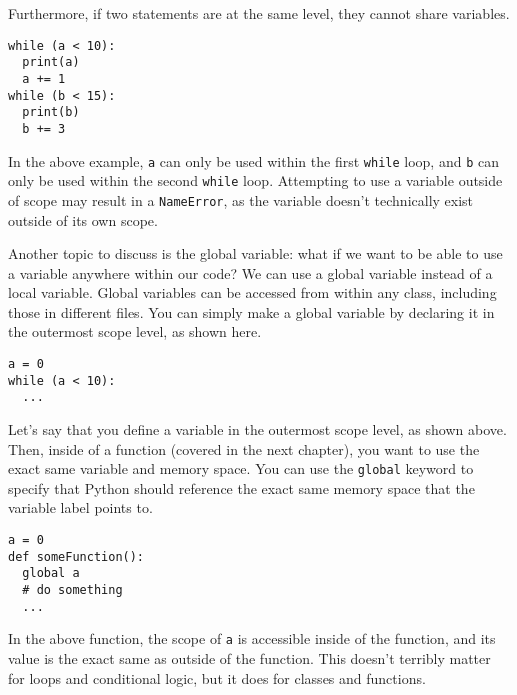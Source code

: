 Furthermore, if two statements are at the same level, they cannot share variables.\par
\begin{lstlisting}[style=pippython]
while (a < 10):
  print(a)
  a += 1
while (b < 15):
  print(b)
  b += 3
\end{lstlisting}
In the above example, \verb|a| can only be used within the first \verb|while| loop, and \verb|b| can only be used within the second \verb|while| loop. Attempting to use a variable outside of scope may result in a \verb|NameError|, as the variable doesn't technically exist outside of its own scope.\par
{}
Another topic to discuss is the global variable: what if we want to be able to use a variable anywhere within our code? We can use a global variable instead of a local variable. Global variables can be accessed from within any class, including those in different files. You can simply make a global variable by declaring it in the outermost scope level, as shown here.\par
\begin{lstlisting}[style=pippython]
a = 0
while (a < 10):
  ...
\end{lstlisting}
Let's say that you define a variable in the outermost scope level, as shown above. Then, inside of a function (covered in the next chapter), you want to use the exact same variable and memory space. You can use the \verb|global| keyword to specify that Python should reference the exact same memory space that the variable label points to.\par
\begin{lstlisting}[style=pippython]
a = 0
def someFunction():
  global a
  # do something
  ...
\end{lstlisting}
In the above function, the scope of \verb|a| is accessible inside of the function, and its value is the exact same as outside of the function. This doesn't terribly matter for loops and conditional logic, but it does for classes and functions.
